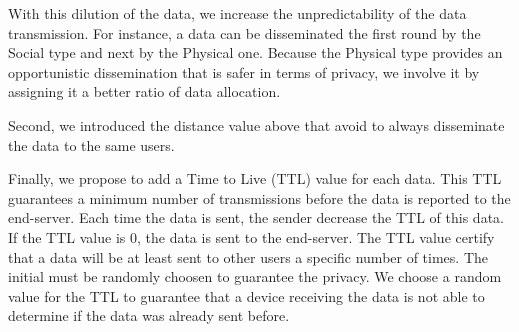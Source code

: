 With this dilution of the data, we increase the unpredictability of the data transmission.
For instance, a data can be disseminated the first round by the Social type and next by the Physical one.
Because the Physical type provides an opportunistic dissemination that is safer in terms of privacy, we involve it by assigning it a better ratio of data allocation.

Second, we introduced the distance value above that avoid to always disseminate the data to the same users.

Finally, we propose to add a Time to Live (TTL) value for each data.
This TTL guarantees a minimum number of transmissions before the data is reported to the end-server.
Each time the data is sent, the sender decrease the TTL of this data.
If the TTL value is 0, the data is sent to the end-server.
The TTL value certify that a data will be at least sent to other users a specific number of times.
The initial must be randomly choosen to guarantee the privacy.
We choose a random value for the TTL to guarantee that a device receiving the data is not able to determine if the data was already sent before.

